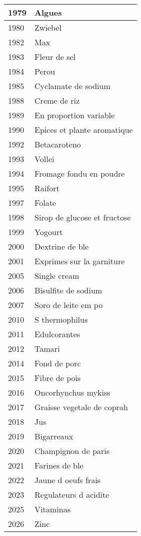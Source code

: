 \begin{longtable}{|l|l|}
1979 & Algues \\ \hline 
1980 & Zwiebel \\ \hline 
1982 & Max \\ \hline 
1983 & Fleur de sel \\ \hline 
1984 & Perou \\ \hline 
1985 & Cyclamate de sodium \\ \hline 
1988 & Creme de riz \\ \hline 
1989 & En proportion variable \\ \hline 
1990 & Epices et plante aromatique \\ \hline 
1992 & Betacaroteno \\ \hline 
1993 & Vollei \\ \hline 
1994 & Fromage fondu en poudre \\ \hline 
1995 & Raifort \\ \hline 
1997 & Folate \\ \hline 
1998 & Sirop de glucose et fructose \\ \hline 
1999 & Yogourt \\ \hline 
2000 & Dextrine de ble \\ \hline 
2001 & Exprimes sur la garniture \\ \hline 
2005 & Single cream \\ \hline 
2006 & Bisulfite de sodium \\ \hline 
2007 & Soro de leite em po \\ \hline 
2010 & S thermophilus \\ \hline 
2011 & Edulcorantes \\ \hline 
2012 & Tamari \\ \hline 
2014 & Fond de porc \\ \hline 
2015 & Fibre de pois \\ \hline 
2016 & Oncorhynchus mykiss \\ \hline 
2017 & Graisse vegetale de coprah \\ \hline 
2018 & Jus \\ \hline 
2019 & Bigarreaux \\ \hline 
2020 & Champignon de paris \\ \hline 
2021 & Farines de ble \\ \hline 
2022 & Jaune d oeufs frais \\ \hline 
2023 & Regulateurs d acidite \\ \hline 
2025 & Vitaminas \\ \hline 
2026 & Zinc \\ \hline 

\end{longtable}
